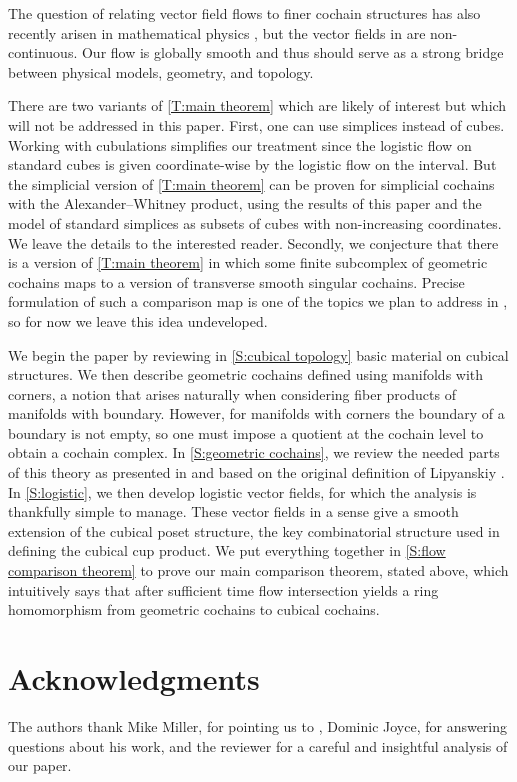 The question of relating vector field flows to finer cochain structures has also recently arisen in mathematical physics \cite{Thor18, Tata20}, but the vector fields in \cite{Tata20} are non-continuous.
Our flow is globally smooth and thus should serve as a strong bridge between physical models, geometry, and topology.

There are two variants of \cref{T:main theorem} which are likely of interest but which will not be addressed in this paper.
First, one can use simplices instead of cubes.
Working with cubulations simplifies our treatment since the logistic flow on standard cubes is given coordinate-wise by the logistic flow on the interval.
But the simplicial version of \cref{T:main theorem} can be proven for simplicial cochains with the Alexander--Whitney product, using the results of this paper and the model of standard simplices as subsets of cubes with non-increasing coordinates.
We leave the details to the interested reader.
Secondly, we conjecture that there is a version of \cref{T:main theorem} in which some finite subcomplex of geometric cochains maps to a version of transverse smooth singular cochains.
Precise formulation of such a comparison map is one of the topics we plan to address in \cite{medina2022foundations}, so for now we leave this idea undeveloped.

We begin the paper by reviewing in \cref{S:cubical topology} basic material on cubical structures.
We then describe geometric cochains defined using manifolds with corners, a notion that arises naturally when considering fiber products of manifolds with boundary.
However, for manifolds with corners the boundary of a boundary is not empty, so one must impose a quotient at the cochain level to obtain a cochain complex.
In \cref{S:geometric cochains}, we review the needed parts of this theory as presented in \cite{medina2022foundations} and based on the original definition of Lipyanskiy \cite{Lipy14}.
In \cref{S:logistic}, we then develop logistic vector fields, for which the analysis is thankfully simple to manage.
These vector fields in a sense give a smooth extension of the cubical poset structure, the key combinatorial structure used in defining the cubical cup product.
We put everything together in \cref{S:flow comparison theorem} to prove our main comparison theorem, stated above, which intuitively says that after sufficient time flow intersection yields a ring homomorphism from geometric cochains to cubical cochains.

\section*{Acknowledgments}

The authors thank Mike Miller, for pointing us to \cite{Lipy14}, Dominic Joyce, for answering questions about his work, and the reviewer for a careful and insightful analysis of our paper.